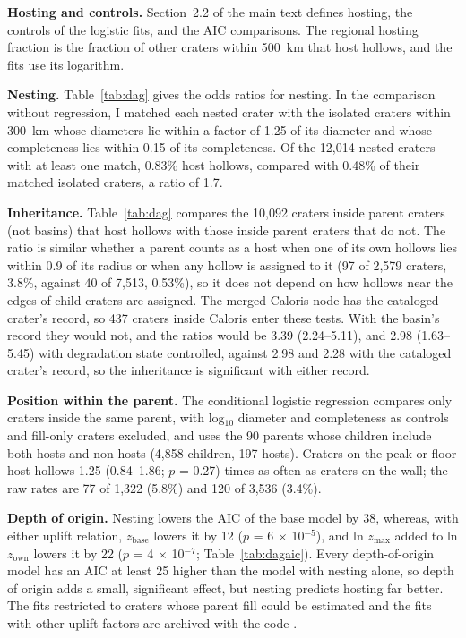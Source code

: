 \documentclass{planetary}
\begin{document}
\textbf{Hosting and controls.} Section~2.2 of the main text defines hosting, the controls of the logistic fits, and the AIC comparisons. The regional hosting fraction is the fraction of other craters within 500~km that host hollows, and the fits use its logarithm.

\textbf{Nesting.} Table~\ref{tab:dag} gives the odds ratios for nesting. In the comparison without regression, I matched each nested crater with the isolated craters within 300~km whose diameters lie within a factor of 1.25 of its diameter and whose completeness lies within 0.15 of its completeness. Of the 12,014 nested craters with at least one match, 0.83\% host hollows, compared with 0.48\% of their matched isolated craters, a ratio of 1.7.

\textbf{Inheritance.} Table~\ref{tab:dag} compares the 10,092 craters inside parent craters (not basins) that host hollows with those inside parent craters that do not. The ratio is similar whether a parent counts as a host when one of its own hollows lies within 0.9 of its radius or when any hollow is assigned to it (97 of 2,579 craters, 3.8\%, against 40 of 7,513, 0.53\%), so it does not depend on how hollows near the edges of child craters are assigned. The merged Caloris node has the cataloged crater's record, so 437 craters inside Caloris enter these tests. With the basin's record they would not, and the ratios would be 3.39 (2.24--5.11), and 2.98 (1.63--5.45) with degradation state controlled, against 2.98 and 2.28 with the cataloged crater's record, so the inheritance is significant with either record.

\textbf{Position within the parent.} The conditional logistic regression compares only craters inside the same parent, with log$_{10}$ diameter and completeness as controls and fill-only craters excluded, and uses the 90 parents whose children include both hosts and non-hosts (4,858 children, 197 hosts). Craters on the peak or floor host hollows 1.25 (0.84--1.86; $p$ = 0.27) times as often as craters on the wall; the raw rates are 77 of 1,322 (5.8\%) and 120 of 3,536 (3.4\%).

\textbf{Depth of origin.} Nesting lowers the AIC of the base model by 38, whereas, with either uplift relation, $z_{\mathrm{base}}$ lowers it by 12 ($p$ = 6 $\times$ 10$^{-5}$), and ln $z_{\max}$ added to ln $z_{\mathrm{own}}$ lowers it by 22 ($p$ = 4 $\times$ 10$^{-7}$; Table~\ref{tab:dagaic}). Every depth-of-origin model has an AIC at least 25 higher than the model with nesting alone, so depth of origin adds a small, significant effect, but nesting predicts hosting far better. The fits restricted to craters whose parent fill could be estimated and the fits with other uplift factors are archived with the code \parencite{zenodo_this}.
\end{document}

